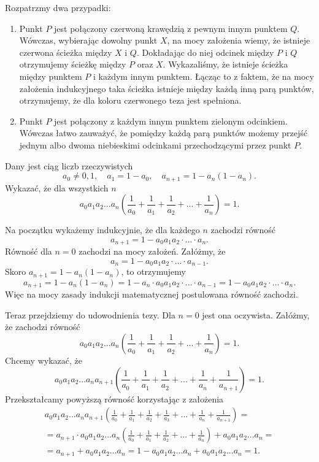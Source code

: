 Rozpatrzmy dwa przypadki:
\begin{enumerate}
	\item Punkt $P$ jest połączony czerwoną krawędzią z pewnym innym punktem $Q$. Wówczas, wybierając dowolny punkt $X$, na mocy założenia wiemy, że istnieje czerwona ścieżka między $X$ i $Q$. Dokładając do niej odcinek między $P$ i $Q$ otrzymujemy ścieżkę między $P$ oraz $X$.
	Wykazaliśmy, że istnieje ścieżka między punktem $P$ i każdym innym punktem. Łącząc to z faktem, że na mocy założenia indukcyjnego taka ścieżka istnieje między każdą inną parą punktów, otrzymujemy, że dla koloru czerwonego teza jest spełniona.
	\item Punkt $P$ jest połączony z każdym innym punktem zielonym odcinkiem. Wówczas łatwo zauważyć, że pomiędzy każdą parą punktów możemy przejść jednym albo dwoma niebieskimi odcinkami przechodzącymi przez punkt $P$.
\end{enumerate}

\begin{problem}{5}
Dany jest ciąg liczb rzeczywistych
\[
	a_0 \neq 0, 1,\quad a_1 = 1 - a_0,\quad a_{n + 1} = 1 - a_n(1 - a_n). 
\]
Wykazać, że dla wszystkich $n$ 
\[
	a_0a_1a_2...a_n\left(\frac{1}{a_0} + \frac{1}{a_1} + \frac{1}{a_2} + ... + \frac{1}{a_n}\right) = 1.
\]
\end{problem}

\noindent
Na początku wykażemy indukcyjnie, że dla każdego $n$ zachodzi równość
\[
	a_{n + 1} = 1 - a_0a_1a_2\cdot ... \cdot a_{n}.
\]
Równość dla $n = 0$ zachodzi na mocy założeń.
Załóżmy, że
\[
	a_{n} = 1 - a_0a_1a_2\cdot ... \cdot a_{n - 1}.
\]
Skoro $a_{n + 1} = 1 - a_n(1 - a_n)$, to otrzymujemy
\[
	a_{n + 1} = 1 - a_n(1 - a_n) = 1 - a_n \cdot a_0a_1a_2\cdot ... \cdot a_{n - 1} = 1 - a_0a_1a_2\cdot ... \cdot a_{n}.
\]
Więc na mocy zasady indukcji matematycznej postulowana równość zachodzi.
\vspace{10px}

\noindent
Teraz przejdziemy do udowodnienia tezy.
Dla $n = 0$ jest ona oczywista.
Załóżmy, że zachodzi równość
\[
	a_0a_1a_2...a_n\left(\frac{1}{a_0} + \frac{1}{a_1} + \frac{1}{a_2} + ... + \frac{1}{a_n}\right) = 1.
\]
Chcemy wykazać, że
\[
	a_0a_1a_2...a_na_{n+1}\left(\frac{1}{a_0} + \frac{1}{a_1} + \frac{1}{a_2} + ... + \frac{1}{a_n} + \frac{1}{a_{n + 1}}\right) = 1.
\]
Przekształcamy powyższą równość korzystając z założenia
\begin{multline*}
	a_0a_1a_2...a_na_{n+1}\left(\frac{1}{a_0} + \frac{1}{a_1} + \frac{1}{a_2} + \frac{1}{a_3} + ... + \frac{1}{a_n} + \frac{1}{a_{n + 1}}\right) = \\ = a_{n+1} \cdot a_0a_1a_2...a_n\left(\frac{1}{a_0} + \frac{1}{a_1} + \frac{1}{a_2} + ... + \frac{1}{a_n}\right) + a_0a_1a_2...a_n = \\ = a_{n + 1} + a_0a_1a_2...a_n = 1 - a_0a_1a_2...a_n + a_0a_1a_2...a_n = 1.
\end{multline*}

